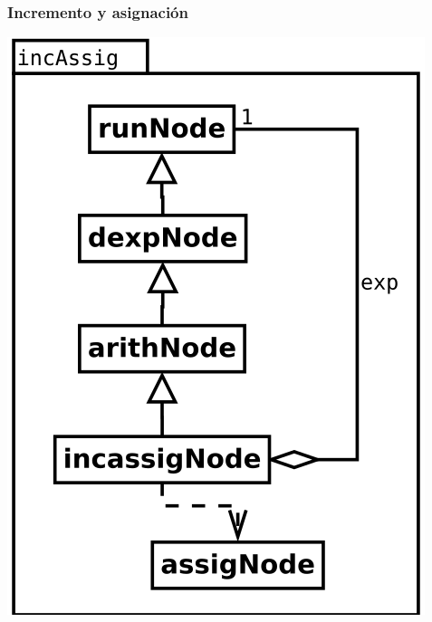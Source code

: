\subsubsection {Incremento y asignación}
\begin{center}
\includegraphics[scale=0.4]{incAssig.png} \\
\end{center}

